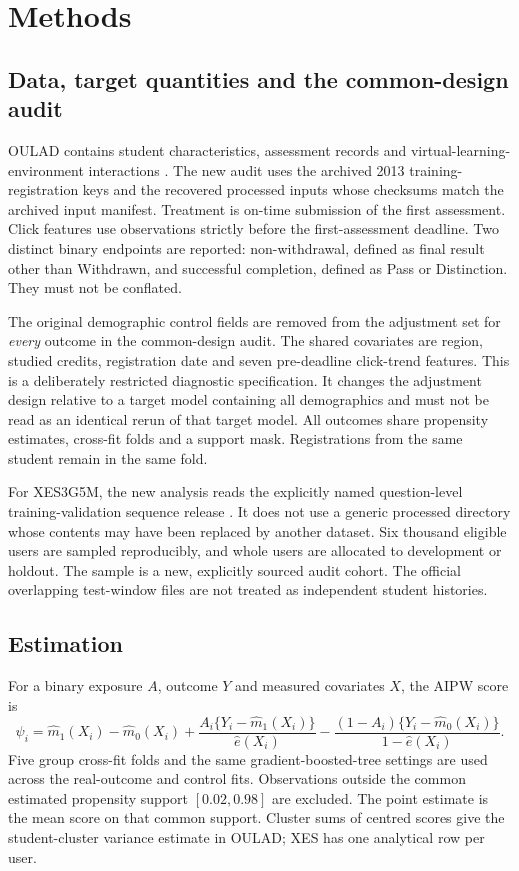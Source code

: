 \section{Methods}

\subsection{Data, target quantities and the common-design audit}

OULAD contains student characteristics, assessment records and virtual-learning-environment interactions \cite{kuzilek2017}. The new audit uses the archived 2013 training-registration keys and the recovered processed inputs whose checksums match the archived input manifest. Treatment is on-time submission of the first assessment. Click features use observations strictly before the first-assessment deadline. Two distinct binary endpoints are reported: non-withdrawal, defined as final result other than Withdrawn, and successful completion, defined as Pass or Distinction. They must not be conflated.

The original demographic control fields are removed from the adjustment set for \emph{every} outcome in the common-design audit. The shared covariates are region, studied credits, registration date and seven pre-deadline click-trend features. This is a deliberately restricted diagnostic specification. It changes the adjustment design relative to a target model containing all demographics and must not be read as an identical rerun of that target model. All outcomes share propensity estimates, cross-fit folds and a support mask. Registrations from the same student remain in the same fold.

For XES3G5M, the new analysis reads the explicitly named question-level training-validation sequence release \cite{liu2023}. It does not use a generic processed directory whose contents may have been replaced by another dataset. Six thousand eligible users are sampled reproducibly, and whole users are allocated to development or holdout. The sample is a new, explicitly sourced audit cohort. The official overlapping test-window files are not treated as independent student histories.

\subsection{Estimation}

For a binary exposure $A$, outcome $Y$ and measured covariates $X$, the AIPW score is
\[
\psi_i=\widehat m_1(X_i)-\widehat m_0(X_i)
+\frac{A_i\{Y_i-\widehat m_1(X_i)\}}{\widehat e(X_i)}
-\frac{(1-A_i)\{Y_i-\widehat m_0(X_i)\}}{1-\widehat e(X_i)}.
\]
Five group cross-fit folds and the same gradient-boosted-tree settings are used across the real-outcome and control fits. Observations outside the common estimated propensity support $[0.02,0.98]$ are excluded. The point estimate is the mean score on that common support. Cluster sums of centred scores give the student-cluster variance estimate in OULAD; XES has one analytical row per user.

